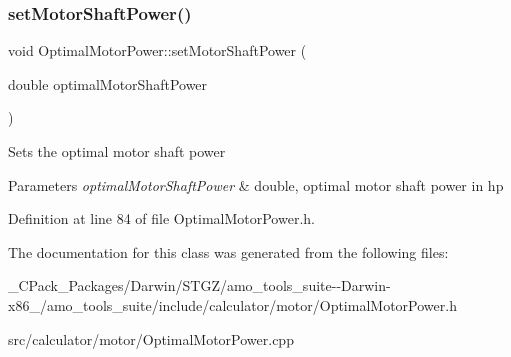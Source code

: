 \mbox{\label{class_optimal_motor_power_ada8a9e3caac34c54470ad13ffe7edf53}} 
\subsubsection{\texorpdfstring{set\+Motor\+Shaft\+Power()}{setMotorShaftPower()}\hspace{0.1cm}{\footnotesize\ttfamily [3/3]}}
{\footnotesize\ttfamily void Optimal\+Motor\+Power\+::set\+Motor\+Shaft\+Power (\begin{DoxyParamCaption}\item[{double}]{optimal\+Motor\+Shaft\+Power }\end{DoxyParamCaption})\hspace{0.3cm}{\ttfamily [inline]}}

Sets the optimal motor shaft power 
\begin{DoxyParams}{Parameters}
{\em optimal\+Motor\+Shaft\+Power} & double, optimal motor shaft power in hp \\
\hline
\end{DoxyParams}


Definition at line 84 of file Optimal\+Motor\+Power.\+h.



The documentation for this class was generated from the following files\+:\begin{DoxyCompactItemize}
\item 
\+\_\+\+C\+Pack\+\_\+\+Packages/\+Darwin/\+S\+T\+G\+Z/amo\+\_\+tools\+\_\+suite-\/-\/\+Darwin-\/x86\+\_/amo\+\_\+tools\+\_\+suite/include/calculator/motor/Optimal\+Motor\+Power.\+h\item 
src/calculator/motor/Optimal\+Motor\+Power.\+cpp\end{DoxyCompactItemize}
